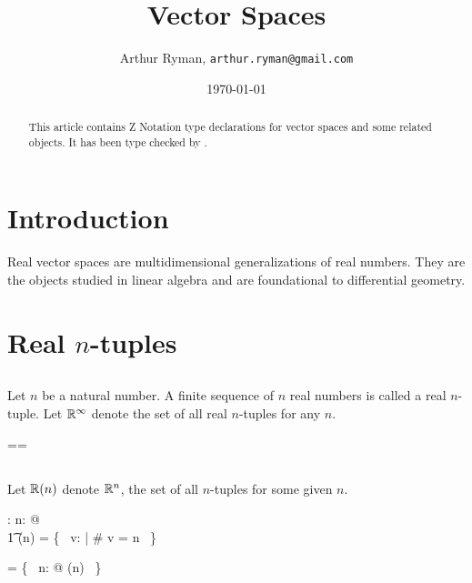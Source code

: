 \documentclass[11pt, oneside]{article}
\title{Vector Spaces}
\author{Arthur Ryman, {\tt arthur.ryman@gmail.com}}
\date{\today}
\begin{document}
\maketitle

\begin{abstract}
This article contains Z Notation type declarations for vector spaces and some related objects.
It has been type checked by \fuzz.
\end{abstract}

\section{Introduction}

Real vector spaces are multidimensional generalizations of real numbers.
They are the objects studied in linear algebra and are foundational to differential geometry.

\section{Real $n$-tuples}

\subsection{}

Let $n$ be a natural number.
A finite sequence of $n$ real numbers is called a real $n$-tuple.
Let $\mathbb{R}^\infty$ denote the set of all real $n$-tuples for any $n$.

\begin{zed}
	\Rinf == \seq \R
\end{zed}

\subsection{}

Let $\mathbb{R}(n)$ denote $\mathbb{R}^n$, the set of all $n$-tuples for some given $n$.
\begin{axdef}
	\Rtuples: \nat \fun \power \Rinf
\where
	\forall n: \nat @ \\
	\t1	\Rtuples(n) = \{~ v: \Rinf | \# v = n ~\}
\end{axdef}

\begin{remark}

\begin{zed}
	\Rinf = \bigcup \{~ n: \nat @ \Rtuples(n) ~\}
\end{zed}

\end{remark}
\end{document}
